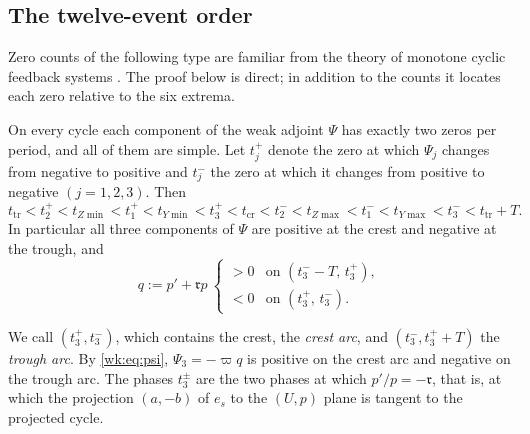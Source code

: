 \subsection{The twelve-event order}
Zero counts of the following type are familiar from the theory of monotone cyclic feedback systems \cite{MPS90}. The proof below is direct; in addition to the counts it locates each zero relative to the six extrema.
\begin{theorem}\label{thm:twelve}
On every cycle each component of the weak adjoint $\Psi$ has exactly two zeros per period, and all of them are simple. Let $t_j^+$ denote the zero at which $\Psi_j$ changes from negative to positive and $t_j^-$ the zero at which it changes from positive to negative $(j=1,2,3)$. Then
\begin{equation}\label{wk:eq:twelve}
t_{\mathrm{tr}}<t_2^+<t_{Z\min}<t_1^+<t_{Y\min}<t_3^+<t_{\mathrm{cr}}
<t_2^-<t_{Z\max}<t_1^-<t_{Y\max}<t_3^-<t_{\mathrm{tr}}+T .
\end{equation}
In particular all three components of $\Psi$ are positive at the crest and negative at the trough, and
\begin{equation}\label{wk:eq:qsign}
q:=p'+\mathfrak r p\ \begin{cases}>0&\text{on }(t_3^--T,\,t_3^+),\\[2pt] <0&\text{on }(t_3^+,\,t_3^-).\end{cases}
\end{equation}
\end{theorem}
We call $(t_3^+,t_3^-)$, which contains the crest, the \emph{crest arc}, and $(t_3^-,t_3^++T)$ the \emph{trough arc}. By \eqref{wk:eq:psi}, $\Psi_3=-\varpi q$ is positive on the crest arc and negative on the trough arc. The phases $t_3^\pm$ are the two phases at which $p'/p=-\mathfrak r$, that is, at which the projection $(a,-b)$ of $e_s$ to the $(U,p)$ plane is tangent to the projected cycle.
